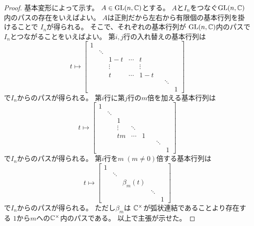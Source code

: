 \documentclass[report]{jlreq}
\begin{document}
\begin{proof}
    基本変形によって示す。
    $A \in \operatorname{\mathrm{GL}}(n, \mathbb{C})$とする。
    $A$と$I_n$をつなぐ$\operatorname{\mathrm{GL}}(n, \mathbb{C})$内のパスの存在をいえばよい。
    $A$は正則だから左右から有限個の基本行列を掛けることで
    $I_n$が得られる。
    そこで、それぞれの基本行列が
    $\operatorname{\mathrm{GL}}(n, \mathbb{C})$内のパスで$I_n$とつながることをいえばよい。
    第$i, j$行の入れ替えの基本行列は
    \begin{equation}
        t \mapsto \left[\begin{smallmatrix}
            1 \\
            & \ddots \\
            & & 1 - t & \cdots & t \\
            & & \vdots & & \vdots \\
            & & t & \cdots & 1 - t \\
            & & & & & & \ddots \\
            & & & & & & & 1
        \end{smallmatrix}\right]
    \end{equation}
    で$I_n$からのパスが得られる。
    第$i$行に第$j$行の$m$倍を加える基本行列は
    \begin{equation}
        t \mapsto \left[\begin{smallmatrix}
            1 \\
            & \ddots \\
            & & 1 \\
            & & \vdots & \ddots \\
            & & tm & \cdots & 1 \\
            & & & & & & \ddots \\
            & & & & & & & 1
        \end{smallmatrix}\right]
    \end{equation}
    で$I_n$からのパスが得られる。
    第$i$行を$m \; (m \neq 0)$倍する基本行列は
    \begin{equation}
        t \mapsto \left[\begin{smallmatrix}
            1 \\
            & \ddots \\
            & & \beta_m(t) \\
            & & & \ddots \\
            & & & & 1
        \end{smallmatrix}\right]
    \end{equation}
    で$I_n$からのパスが得られる。
    ただし$\beta_m$は
    $\mathbb{C}^\times$が弧状連結であることより存在する
    $1$から$m$への$\mathbb{C}^\times$内のパスである。
    以上で主張が示せた。
\end{proof}
\end{document}
